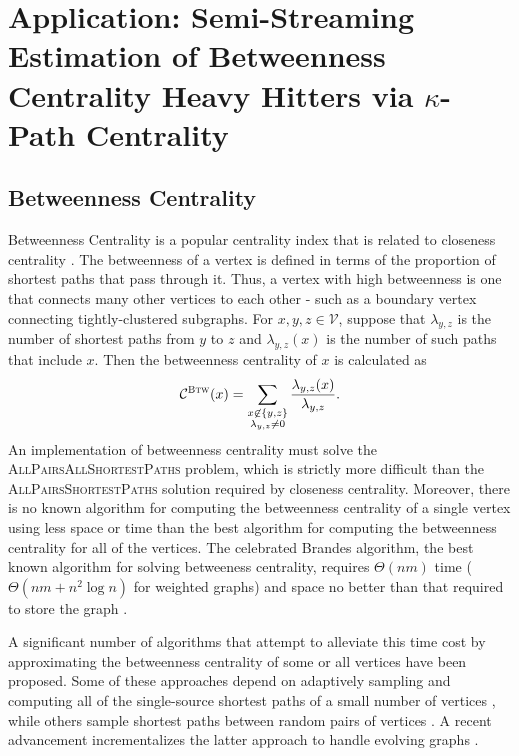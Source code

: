 \documentclass{report}
\newcommand{\algoname}[1]{\textnormal{\textsc{#1}}}
\begin{document}
\section{Application: Semi-Streaming Estimation of Betweenness Centrality Heavy Hitters via $\kappa$-Path Centrality} 
\label{sec:sskpc}


\subsection{Betweenness Centrality} 
\label{sec:bc}

Betweenness Centrality is a popular centrality index that is related to closeness centrality \cite{freeman1977set}. 
The betweenness of a vertex is defined in terms of the proportion of shortest paths that pass through it.
Thus, a vertex with high betweenness is one that connects many other vertices to each other - such as a boundary vertex connecting tightly-clustered subgraphs.
For $x,y, z \in \mathcal{V}$, suppose that $\lambda_{y,z}$ is the number of shortest paths from $y$ to $z$ and $\lambda_{y,z}(x)$ is the number of such paths that include $x$. 
Then the betweenness centrality of $x$ is calculated as
%
\begin{equation} \label{eq:bc}
\mathcal{C}^{\algoname{Btw}}(x) = \sum\limits_{\substack{x \not\in \{y,z\} \\ \lambda_{y,z} \neq 0}} \frac{\lambda_{y,z}(x)}{\lambda_{y,z}}.
\end{equation}
%
An implementation of betweenness centrality must solve the \algoname{AllPairsAllShortestPaths} problem, which is strictly more difficult than the \algoname{AllPairsShortestPaths} solution required by closeness centrality.
Moreover, there is no known algorithm for computing the betweenness centrality of a single vertex using less space or time than the best algorithm for computing the betweenness centrality for all of the vertices. 
The celebrated Brandes algorithm, the best known algorithm for solving betweeness centrality, requires $\Theta(nm)$ time ($\Theta(nm + n^2\log n)$ for weighted graphs) and space no better than that required to store the graph  \cite{brandes2001faster}. 

A significant number of algorithms that attempt to alleviate this time cost by approximating the betweenness centrality of some or all vertices have been proposed. 
Some of these approaches depend on adaptively sampling and computing all of the single-source shortest paths of a small number of vertices \cite{bader2007approximating,brandes2007centrality}, while others sample shortest paths between random pairs of vertices \cite{riondato2016fast}. 
A recent advancement incrementalizes the latter approach to handle evolving graphs \cite{bergamini2014approximating}.
\end{document}

